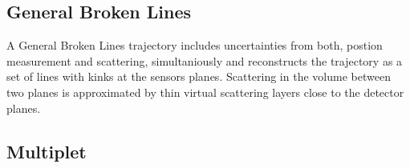 \subsection*{General Broken Lines}
A General Broken Lines trajectory \cite{gbl} includes uncertainties from
both, postion measurement and scattering, simultaniously and reconstructs the
trajectory as a set of lines with kinks at the sensors planes. Scattering in
the volume between two planes is approximated by thin virtual scattering
layers close to the detector planes.
\subsection*{Multiplet}

